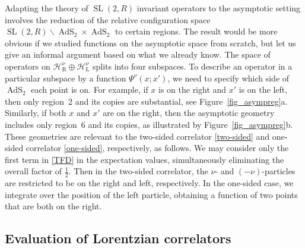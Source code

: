 \documentclass[12pt]{article}
\newcommand{\calH}{\mathcal{H}}
\newcommand{\RR}{\mathbb{R}}
\DeclareMathOperator{\tSL}{\widetilde{\mathrm{SL}}}
\DeclareMathOperator{\tAdS}{\widetilde{AdS}}
\newcommand{\la}{\text{L}}
\newcommand{\ra}{\text{R}}
\def\widetilde#1{#1}%
\def\RR{R}
\begin{document}
Adapting the theory of $\tSL(2,\RR)$ invariant operators to the asymptotic setting involves the reduction of the relative configuration space $\tSL(2,\RR)\backslash \tAdS_2\times\tAdS_2$ to certain regions. The result would be more obvious if we studied functions on the asymptotic space from scratch, but let us give an informal argument based on what we already know. The space of operators on $\calH^{\nu}_{\ra}\oplus\calH^{\nu}_{\la}$ splits into four subspaces. To describe an operator in a particular subspace by a function $\Psi^{\nu}(x;x')$, we need to specify which side of $\tAdS_2$ each point is on. For example, if $x$ is on the right and $x'$ is on the left, then only region~2 and its copies are substantial, see Figure~\ref{fig_asympreg}a. Similarly, if both $x$ and $x'$ are on the right, then the asymptotic geometry includes only region~6 and its copies, as illustrated by Figure~\ref{fig_asympreg}b. These geometries are relevant to the two-sided correlator \eqref{two-sided} and one-sided correlator \eqref{one-sided}, respectively, as follows. We may consider only the first term in \eqref{TFD} in the expectation values, simultaneously eliminating the overall factor of $\frac{1}{2}$. Then in the two-sided correlator, the $\nu$- and $(-\nu)$-particles are restricted to be on the right and left, respectively. In the one-sided case, we integrate over the position of the left particle, obtaining a function of two points that are both on the right. 



\subsection{Evaluation of Lorentzian correlators}
\end{document}
